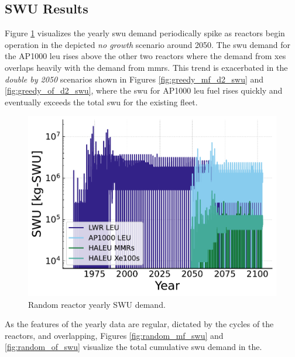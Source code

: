 \subsection{SWU Results}
\label{sec:random_swu}

Figure \ref{fig:swu_yearly_random} visualizes the yearly \gls{swu} demand periodically spike as reactors begin operation in the depicted \textit{no growth} scenario around 2050. The \gls{swu} demand for the AP1000 \gls{leu} rises above the other two reactors where the demand from \glspl{xe} overlaps heavily with the demand from \glspl{mmr}. This trend is exacerbated in the \textit{double by 2050} scenarios shown in Figures \ref{fig:greedy_mf_d2_swu} and \ref{fig:greedy_of_d2_swu}, where the \gls{swu} for AP1000 \gls{leu} fuel rises quickly and eventually exceeds the total \gls{swu} for the existing fleet.



\begin{figure}[H]
    \centering
    \includegraphics[scale=0.7]{images/results/swu/multi_drng_swu_by_fuel.pdf}
    \caption{Random reactor yearly SWU demand.}
    \label{fig:swu_yearly_random}
\end{figure}

As the features of the yearly data are regular, dictated by the cycles of the
reactors, and overlapping, Figures \ref{fig:random_mf_swu} and \ref{fig:random_of_swu} visualize the total cumulative \gls{swu} demand in the.


